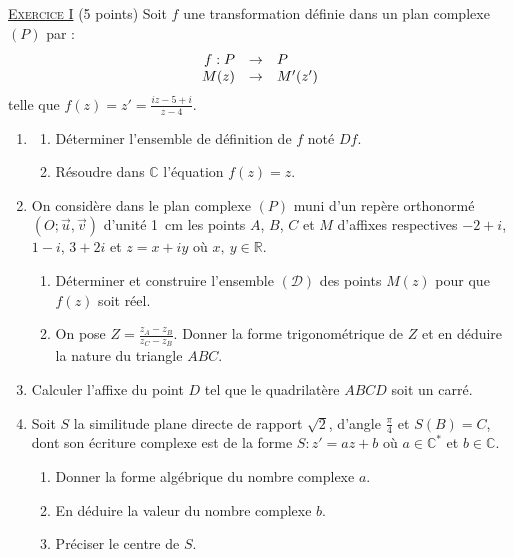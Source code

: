 \noindent \underline{\textsc{Exercice I}} (5 points) \newline
      Soit $f$ une transformation d\'efinie dans un plan complexe $(P)$ par :
      \[
      \begin{array}[t]{rcl}
            f : P & \rightarrow & P \\
             M(z) & \rightarrow & M'(z')
      \end{array}
      \]
      telle que 
      $f(z) = z' = \frac{iz - 5 + i}{z-4}$.
      \begin{enumerate}
            \item \begin{enumerate}
                        \item D\'eterminer l'ensemble de d\'efinition de $f$ not\'e $Df$.
                        \item R\'esoudre dans $\mathbb{C}$ l'\'equation $f(z) = z$.
                  \end{enumerate}
            \item On consid\`ere dans le plan complexe $(P)$ muni d'un rep\`ere orthonorm\'e $(O;\vec{u},\vec{v})$
                  d'unit\'e 1~cm les points $A$, $B$, $C$ et $M$ d'affixes respectives 
                  $-2+i$, $1-i$, $3+2i$ et $z = x + i y$ o\`u $x,\ y \in \mathbb{R}$.
                  \begin{enumerate}
                        \item D\'eterminer et construire l'ensemble $(\mathscr{D})$ des 
                              points $M(z)$ pour que $f(z)$ soit r\'eel.
                        \item On pose $Z = \frac{z_A - z_B}{z_C - z_B}$.
                              Donner la forme trigonom\'etrique de $Z$ et en d\'eduire la nature du triangle $ABC$.
                  \end{enumerate}
            \item Calculer l'affixe du point $D$ tel que le quadrilat\`ere $ABCD$ soit un carr\'e.
            \item Soit $S$ la similitude plane directe de rapport $\sqrt{2}$, d'angle $\frac{\pi}{4}$ et $S(B) = C$,
                  dont son \'ecriture complexe est de la forme $S : z' = a z + b$ o\`u $a\in\mathbb{C}^*$ et $b\in\mathbb{C}$.
                  \begin{enumerate}
                        \item Donner la forme alg\'ebrique du nombre complexe $a$.
	                        \item En d\'eduire la valeur du nombre complexe $b$.
	                        \item Pr\'eciser le centre de $S$.
                  \end{enumerate}
      \end{enumerate}
